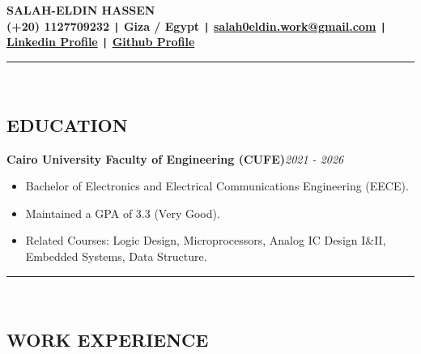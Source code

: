 \documentclass[11pt,a4paper]{article}
\begin{document}
\begin{center}
\fontsize{22}{22}\textbf{SALAH-ELDIN HASSEN}\\[0.2cm]
\fontsize{11}{12}\textbf{ (+20) 1127709232 \texttt{|} Giza / Egypt \texttt{|}  \href{mailto:salah0eldin.work@gmail.com}{salah0eldin.work@gmail.com} \texttt{{|}} \href{https://www.linkedin.com/in/salah-eldin-hassen-5bba10250/}{Linkedin Profile} \texttt{{|}} \href{https://github.com/salah0eldin}{Github Profile}}\\[-0.1cm]
\rule{\textwidth}{0.3pt}\\
\end{center}
\vspace{-0.9cm}
\begin{center}
\section*{\fontsize{14}{18}\textbf\selectfont EDUCATION}
\end{center}
\vspace{-0.2cm}
\renewcommand\labelitemi{\raisebox{0.2ex}{\scriptsize$\bullet$}}
\begin{flushleft}
\textbf{Cairo University Faculty of Engineering (CUFE)}\hfill\textit{2021 - 2026}\\
\end{flushleft}
\vspace{-0.6cm}
\begin{itemize}
\item \setlength{\itemsep}{-0.0em} Bachelor of Electronics and Electrical Communications Engineering (EECE).
\item \setlength{\itemsep}{-0.0em} Maintained a GPA of 3.3 (Very Good).
\item \setlength{\itemsep}{-0.0em} Related Courses:  Logic Design, Microprocessors, Analog IC Design I\&II, Embedded Systems, Data Structure.
\end{itemize}
\vspace{-0.3cm}
\vspace{-0.2cm}
\rule{\textwidth}{0.3pt}\\
\vspace{-0.9cm}
\begin{center}
\section*{\fontsize{14}{ 18 }\textbf\selectfont WORK EXPERIENCE}
\end{center}
\vspace{-0.2cm}
\end{document}
